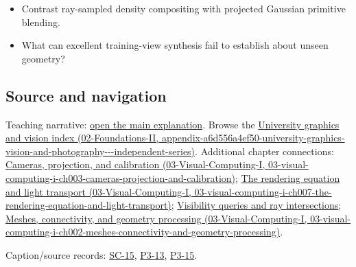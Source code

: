 \begin{itemize}
\tightlist
\item
  Contrast ray-sampled density compositing with projected Gaussian primitive blending.
\item
  What can excellent training-view synthesis fail to establish about unseen geometry?
\end{itemize}

\subsection{Source and navigation}\label{appendix-c5b332e400e7-source-and-navigation}

Teaching narrative: \hyperref[04-visual-computing-ii-ch034-learned-representations-of-3d-shape-and-scenes]{open the main explanation}. Browse the \href{../02-Foundations-II/main.pdf\#nameddest=appendix-a6d556a4ef50-university-graphics-vision-and-photography---independent-series}{University graphics and vision index (02-Foundations-II, appendix-a6d556a4ef50-university-graphics-vision-and-photography-\/-\/-independent-series)}. Additional chapter connections: \href{../03-Visual-Computing-I/main.pdf\#nameddest=03-visual-computing-i-ch003-cameras-projection-and-calibration}{Cameras, projection, and calibration (03-Visual-Computing-I, 03-visual-computing-i-ch003-cameras-projection-and-calibration)}; \href{../03-Visual-Computing-I/main.pdf\#nameddest=03-visual-computing-i-ch007-the-rendering-equation-and-light-transport}{The rendering equation and light transport (03-Visual-Computing-I, 03-visual-computing-i-ch007-the-rendering-equation-and-light-transport)}; \hyperref[04-visual-computing-ii-ch028-visibility-queries-and-ray-intersections]{Visibility queries and ray intersections}; \href{../03-Visual-Computing-I/main.pdf\#nameddest=03-visual-computing-i-ch002-meshes-connectivity-and-geometry-processing}{Meshes, connectivity, and geometry processing (03-Visual-Computing-I, 03-visual-computing-i-ch002-meshes-connectivity-and-geometry-processing)}.

Caption/source records: \hyperref[04-visual-computing-ii-ch036-sc-15---stanford-cs231n-deep-learning-for-computer-vision-spring-2025-lecture-15-3d-vision]{SC-15}, \hyperref[04-visual-computing-ii-ch036-p3-13---curves-and-surfaces]{P3-13}, \hyperref[04-visual-computing-ii-ch036-p3-15---ray-tracing]{P3-15}.

